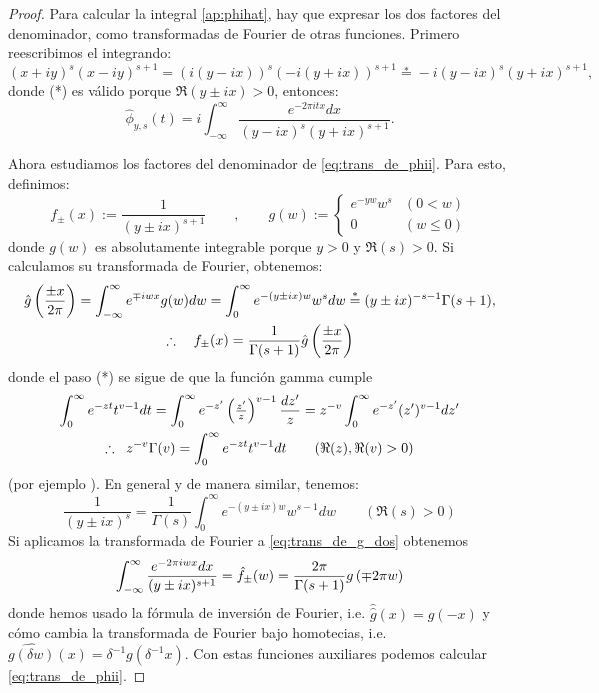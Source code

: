 \begin{proof}
  Para calcular la integral \eqref{ap:phihat}, hay que
  expresar los dos factores del denominador, como transformadas de Fourier de otras funciones. Primero
  reescribimos el integrando:
\[
  (x+iy)^s(x-iy)^{s+1}=
  (i(y-ix))^s(-i(y+ix))^{s+1}\overset{*}{=}
  -i(y-ix)^s(y+ix)^{s+1},
\]
donde (*) es v\'alido porque $\Re(y\pm ix)>0$, entonces:
\begin{equation}\label{eq:trans_de_phii}
  \hat{\phi}_{y,s}(t)=
  i\int_{-\infty}^{\infty}\frac{e^{-2\pi itx}dx}{(y-ix)^s(y+ix)^{s+1}}.
\end{equation}

Ahora estudiamos los factores del denominador de \eqref{eq:trans_de_phii}. Para esto, definimos:
\[
  f_{\pm}(x):=\frac{1}{(y\pm ix)^{s+1}} \qquad,\qquad
  g(w):=
  \begin{cases}
    e^{-yw}w^s &(0<w)\\
    0 &(w\leq 0)
  \end{cases}
\]
donde $g(w)$ es absolutamente integrable porque $y>0$ y $\Re(s)>0$. Si calculamos su transformada de
Fourier, obtenemos:
\begin{gather}
  \hat{g}\left( \frac{\pm x}{2\pi} \right)=
  \int_{-\infty}^{\infty}e^{\mp iwx}g(w)dw=
  \int_0^{\infty}e^{-(y\pm ix)w}w^sdw\overset{*}{=}
  (y\pm ix)^{-s-1}\Gamma(s+1),\nonumber\\
  \therefore \quad f_{\pm}(x)=\frac{1}{\Gamma(s+1)} \hat{g}\left( \frac{\pm x}{2\pi} \right)
  \label{eq:trans_de_g_dos}
\end{gather}
donde el paso (*) se sigue de que la funci\'on gamma cumple
\begin{gather}
  \int_0^{\infty}e^{-zt}t^{v-1}dt=
  \int_0^{\infty}e^{-z'}\left( \tfrac{z'}{z} \right)^{v-1}\frac{dz'}{z}=
  z^{-v}\int_0^{\infty}e^{-z'}(z')^{v-1}dz'\nonumber\\
  \therefore\;\;z^{-v}\Gamma(v) = \int_0^{\infty}e^{-zt}t^{v-1}dt
  \qquad(\Re(z),\Re(v)>0)\label{eq:prop_gamma}
\end{gather}
(por ejemplo \cite[\S5.2.5]{AhlforsCA}). En general y de manera similar, tenemos:
\begin{equation}\label{eq:denominador}
  \frac{1}{(y\pm ix)^s}=
  \frac{1}{\Gamma(s)}\int_0^{\infty}e^{-(y\pm ix)w}w^{s-1}dw\qquad(\Re(s)>0)
\end{equation}
Si aplicamos la transformada de Fourier a \eqref{eq:trans_de_g_dos} obtenemos
\begin{equation}\label{eq:trans_de_f}
  \int_{-\infty}^{\infty}\frac{e^{-2\pi iwx}dx}{(y\pm ix)^{s+1}}=\hat{f}_{\pm}(w)=
  \frac{2\pi}{\Gamma(s+1)}g\left( \mp 2\pi w \right)
\end{equation}
donde hemos usado la f\'ormula de inversi\'on de Fourier, i.e. $\hat{\hat{g}}(x)=g(-x)$ y c\'omo
cambia la transformada de Fourier bajo homotecias, i.e.
$\widehat{g(\delta w)}(x)=\delta^{-1}g(\delta^{-1}x)$. Con estas funciones auxiliares podemos
calcular \eqref{eq:trans_de_phii}.


\end{proof}
